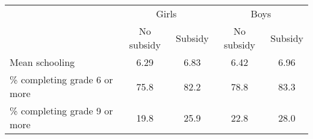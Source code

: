     \begin{tabular}{lcccc}
    \toprule
                    & \multicolumn{2}{c}{Girls} & \multicolumn{2}{c}{Boys} \\
                    \cmidrule(r){2-3}         \cmidrule(r){4-5}
                    & No subsidy & Subsidy      & No subsidy & Subsidy      \\
    \midrule
    Mean schooling  & 6.29      & 6.83          & 6.42      & 6.96          \\
    \% completing grade 6 or more & 75.8 & 82.2 & 78.8      & 83.3          \\
    \% completing grade 9 or more & 19.8 & 25.9 & 22.8      & 28.0          \\
    \bottomrule
    \end{tabular}
